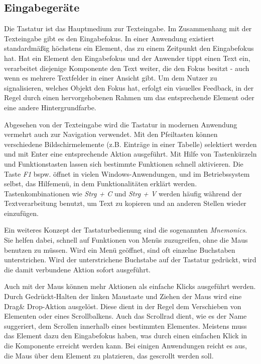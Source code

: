 \subsection{Eingabegeräte} \label{sec:inputDevices}
Die Tastatur ist das Hauptmedium zur Texteingabe. Im Zusammenhang mit der Texteingabe gibt es den Eingabefokus. In einer Anwendung existiert standardmäßig höchstens ein Element, das zu einem Zeitpunkt den Eingabefokus hat. Hat ein Element den Eingabefokus und der Anwender tippt einen Text ein, verarbeitet diejenige Komponente den Text weiter, die den Fokus besitzt - auch wenn es mehrere Textfelder in einer Ansicht gibt. Um dem Nutzer zu signalisieren, welches Objekt den Fokus hat, erfolgt ein visuelles Feedback, in der Regel durch einen hervorgehobenen Rahmen um das entsprechende Element oder eine andere Hintergrundfarbe.\par
Abgesehen von der Texteingabe wird die Tastatur in modernen Anwendung vermehrt auch zur Navigation verwendet. Mit den Pfeiltasten können verschiedene Bildschirmelemente (z.B. Einträge in einer Tabelle) selektiert werden und mit Enter eine entsprechende Aktion ausgeführt. Mit Hilfe von Tastenkürzeln und Funktionstasten lassen sich bestimmte Funktionen schnell aktivieren. Die Taste \textit{F1} bspw. öffnet in vielen Windows-Anwendungen, und im Betriebssystem selbst, das Hilfemenü, in dem Funktionalitäten erklärt werden. Tastenkombinationen wie \textit{Strg + C} und \textit{Strg + V} werden häufig während der Textverarbeitung benutzt, um Text zu kopieren und an anderen Stellen wieder einzufügen.\par
Ein weiteres Konzept der Tastaturbedienung sind die sogenannten \textit{Mnemonics}. Sie helfen dabei, schnell auf Funktionen von Menüs zuzugreifen, ohne die Maus benutzen zu müssen. Wird ein Menü geöffnet, sind oft einzelne Buchstaben unterstrichen. Wird der unterstrichene Buchstabe auf der Tastatur gedrückt, wird die damit verbundene Aktion sofort ausgeführt.\par
{}
Auch mit der Maus können mehr Aktionen als einfache Klicks ausgeführt werden. Durch Gedrückt-Halten der linken Maustaste und Ziehen der Maus wird eine Drag\& Drop-Aktion ausgelöst. Diese dient in der Regel dem Verschieben von Elementen oder eines Scrollbalkens. Auch das Scrollrad dient, wie es der Name suggeriert, dem Scrollen innerhalb eines bestimmten Elementes. Meistens muss das Element dazu den Eingabefokus haben, was durch einen einfachen Klick in die Komponente erreicht werden kann. Bei einigen Anwendungen reicht es aus, die Maus über dem Element zu platzieren, das gescrollt werden soll.\par
